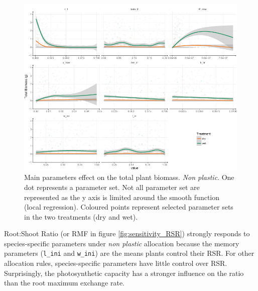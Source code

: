 \begin{figure}
\includegraphics[width = \textwidth]{./2_PP/Figures/Calibration/par_effect_none_BM.png}
\caption{Main parameters effect on the total plant biomass. \textit{Non plastic}. One dot represents a parameter set. Not all parameter set are represented as the y axis is limited around the smooth function (local regression). Coloured points represent selected parameter sets in the two treatments (\textcolor{myOrange}{dry} and \textcolor{myGreen}{wet}).}\label{fig:sensitivity_BM}
\end{figure}

Root:Shoot Ratio (or RMF in figure \ref{fig:sensitivity_RSR}) strongly responds to species-specific parameters under \textit{non plastic} allocation because the memory parameters (\texttt{l\_ini} and \texttt{w\_ini}) are the means plants control their RSR. For other allocation rules, species-specific parameters have little control over RSR. Surprisingly, the photosynthetic capacity has a stronger influence on the ratio than the root maximum exchange rate.



